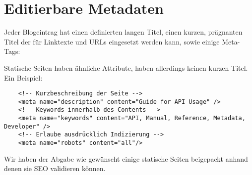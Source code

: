 \section{Editierbare Metadaten}
Jeder Blogeintrag hat einen definierten langen Titel, einen kurzen, prägnanten
Titel der für Linktexte und URLs eingesetzt werden kann, sowie einige Meta-Tags:


Statische Seiten haben ähnliche Attribute, haben allerdings keinen kurzen Titel.
Ein Beispiel:

\begin{verbatim}
    <!-- Kurzbeschreibung der Seite -->
    <meta name="description" content="Guide for API Usage" />
    <!-- Keywords innerhalb des Contents -->
    <meta name="keywords" content="API, Manual, Reference, Metadata, Developer" />
    <!-- Erlaube ausdrücklich Indizierung -->
    <meta name="robots" content="all"/>
\end{verbatim}




Wir haben der Abgabe wie gewünscht einige statische Seiten beigepackt anhand denen sie SEO
validieren können.
